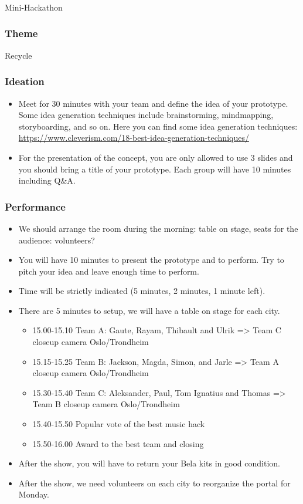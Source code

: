 \documentclass[screen, aspectratio=169]{beamer}
\begin{document}
%
\usebackgroundtemplate{}
\begin{frame}
\frametitle{}
{\huge Mini-Hackathon}
\end{frame}
%
\begin{frame}
\frametitle{Theme}
{\Huge Recycle}
\end{frame}
%
\begin{frame}
  \frametitle{Ideation}
    \begin{itemize}
    	\item Meet for 30 minutes with your team and define the idea of your prototype. Some idea generation techniques include brainstorming, mindmapping, storyboarding, and so on. Here you can find some idea generation techniques: \url{https://www.cleverism.com/18-best-idea-generation-techniques/}
	\item For the presentation of the concept, you are only allowed to use 3 slides and you should bring a title of your prototype. Each group will have 10 minutes including Q\&A.
    \end{itemize}
\end{frame}
%
\begin{frame}
\frametitle{Performance}
\begin{itemize}
\item We should arrange the room during the morning: table on stage, seats for the audience: volunteers?
\item You will have 10 minutes to present the prototype and to perform. Try to pitch your idea and leave enough time to perform.  
\item Time will be strictly indicated (5 minutes, 2 minutes, 1 minute left). 
\item There are 5 minutes to setup, we will have a table on stage for each city.
	\begin{itemize}
	\item 15.00-15.10 Team A: Gaute, Rayam, Thibault and Ulrik {\scriptsize => Team C closeup camera Oslo/Trondheim}
	\item 15.15-15.25 Team B: Jackson, Magda, Simon, and Jarle  => {\scriptsize Team A closeup camera Oslo/Trondheim}
	\item 15.30-15.40 Team C: Aleksander, Paul, Tom Ignatius and Thomas => {\scriptsize Team B closeup camera Oslo/Trondheim}
	\item 15.40-15.50 Popular vote of the best music hack
	\item 15.50-16.00 Award to the best team and closing
	\end{itemize}
\item After the show, you will have to return your Bela kits in good condition.
\item After the show, we need volunteers on each city to reorganize the portal for Monday.
\end{itemize}	
\end{frame}
\end{document}
